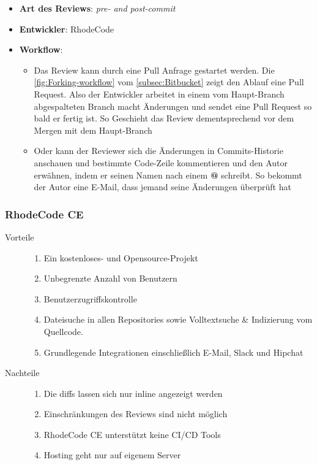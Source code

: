 \begin{itemize}
	\item \textbf{Art des Reviews}: \textit{pre- and post-commit}
	\item \textbf{Entwickler}: RhodeCode
	\item \textbf{Workflow}:
	\begin{itemize}
		\item Das Review kann durch eine Pull Anfrage gestartet werden. Die \cref{fig:Forking-workflow} vom \cref{subsec:Bitbucket} zeigt den Ablauf
			eine Pull Request. Also der Entwickler arbeitet in einem vom Haupt-Branch abgespalteten Branch macht Änderungen und sendet eine Pull Request so bald er fertig ist. 
			So Geschieht das Review dementsprechend vor dem Mergen mit dem Haupt-Branch
		\item Oder kann der Reviewer sich die Änderungen in Commits-Historie anschauen und bestimmte Code-Zeile kommentieren und den Autor erwähnen, indem er seinen Namen nach einem 
			\textbf{@} schreibt. So bekommt der Autor eine E-Mail, dass jemand seine Änderungen überprüft hat
	\end{itemize}
\end{itemize}

\subsubsection{RhodeCode CE}
\label{subsubsec:RhodeCode CE}

\begin{description}
	\item [Vorteile] \hfill
		\begin{enumerate}
			\item Ein kostenloses- und Opensource-Projekt
			\item Unbegrenzte Anzahl von Benutzern
			\item Benutzerzugriffskontrolle
			\item Dateisuche in allen Repositories sowie Volltextsuche \& Indizierung vom Quellcode.
			\item Grundlegende Integrationen einschließlich E-Mail, Slack und Hipchat
		\end{enumerate}
	\item [Nachteile] \hfill
		\begin{enumerate}
			\item Die diffs lassen sich nur inline angezeigt werden
			\item Einschränkungen des Reviews sind nicht möglich
			\item RhodeCode CE unterstützt keine \ac{CI}/\ac{CD} Tools
			\item Hosting geht nur auf eigenem Server
		\end{enumerate}
\end{description}

